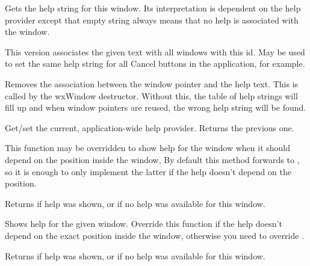 Gets the help string for this window. Its interpretation is dependent on the help provider
except that empty string always means that no help is associated with
the window.


This version associates the given text with all windows with this id.
May be used to set the same help string for all Cancel buttons in
the application, for example.


\label{wxhelpproviderremovehelp}


Removes the association between the window pointer and the help text. This is
called by the wxWindow destructor. Without this, the table of help strings will fill up
and when window pointers are reused, the wrong help string will be found.


\label{wxhelpproviderset}


Get/set the current, application-wide help provider. Returns
the previous one.


\label{wxhelpprovidershowhelpatpoint}


This function may be overridden to show help for the window when it should
depend on the position inside the window, By default this method forwards to 
, so it is enough to only implement
the latter if the help doesn't depend on the position.

Returns \true if help was shown, or \false if no help was available for this
window.







\label{wxhelpprovidershowhelp}


Shows help for the given window. Override this function if the help doesn't
depend on the exact position inside the window, otherwise you need to override 
.

Returns \true if help was shown, or \false if no help was available for this
window.

